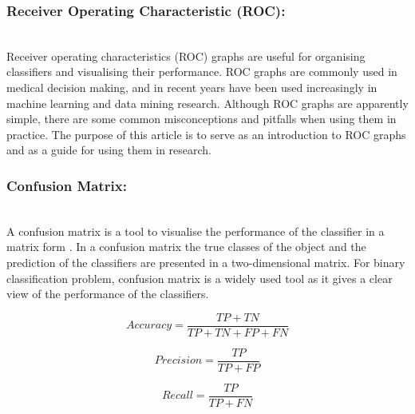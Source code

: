 \subsubsection{Receiver Operating Characteristic (ROC):}\hspace*{\fill} \\
Receiver operating characteristics (ROC) graphs are useful for organising classifiers and visualising their performance. ROC graphs are commonly used in medical decision making, and in recent years have been used increasingly in machine learning and data mining research. Although ROC graphs are apparently simple, there are some common misconceptions and pitfalls when using them in practice. The purpose of this article is to serve as an introduction to ROC graphs and as a guide for using them in research. \cite{FAWCETT2006861}

\subsubsection{Confusion Matrix:}\hspace*{\fill} \\
A confusion matrix is a tool to visualise the performance of the classifier in a matrix form \cite{Ting2017}. In a confusion matrix the true classes of the object and the prediction of the classifiers are presented in a two-dimensional matrix. For binary classification problem, confusion matrix is a widely used tool as it gives a clear view of the performance of the classifiers. 

\begin{equation} \label{eq:aqquracy}
    Accuracy = \frac{TP+TN}{TP+TN+FP+FN}
\end{equation}

\begin{equation} \label{eq:precision}
    Precision = \frac{TP}{TP+FP}
\end{equation}

\begin{equation} \label{eq:recall}
    Recall = \frac{TP}{TP+FN}
\end{equation}


